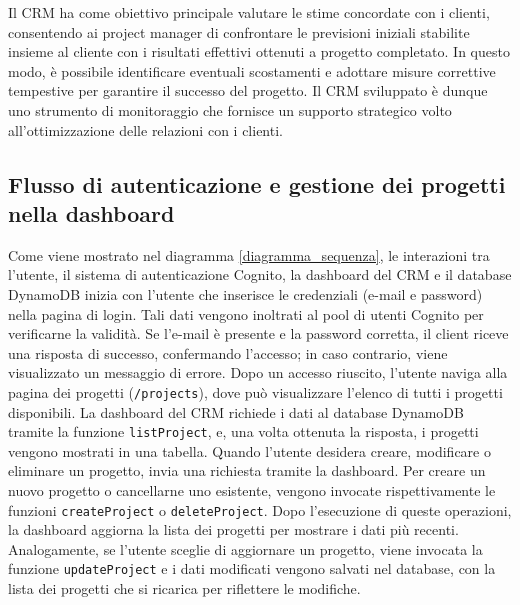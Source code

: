 \documentclass[target=bach,aauheader=,style=]{thud}
\begin{document}
\noindent Il CRM ha come obiettivo principale valutare le stime concordate con i clienti, consentendo ai project manager di confrontare le previsioni iniziali stabilite insieme al cliente con i risultati effettivi ottenuti a progetto completato. In questo modo, è possibile identificare eventuali scostamenti e adottare misure correttive tempestive per garantire il successo del progetto. Il CRM sviluppato è dunque uno strumento di monitoraggio che fornisce un supporto strategico volto all'ottimizzazione delle relazioni con i clienti.

\subsection{Flusso di autenticazione e gestione dei progetti nella dashboard}
Come viene mostrato nel diagramma \ref{diagramma_sequenza}, le interazioni tra l'utente, il sistema di autenticazione Cognito, la dashboard del CRM e il database DynamoDB inizia con l'utente che inserisce le credenziali (e-mail e password) nella pagina di login. Tali dati vengono inoltrati al pool di utenti Cognito per verificarne la validità. Se l'e-mail è presente e la password corretta, il client riceve una risposta di successo, confermando l'accesso; in caso contrario, viene visualizzato un messaggio di errore. Dopo un accesso riuscito, l'utente naviga alla pagina dei progetti (\texttt{/projects}), dove può visualizzare l'elenco di tutti i progetti disponibili. La dashboard del CRM richiede i dati al database DynamoDB tramite la funzione \texttt{listProject}, e, una volta ottenuta la risposta, i progetti vengono mostrati in una tabella. Quando l'utente desidera creare, modificare o eliminare un progetto, invia una richiesta tramite la dashboard. Per creare un nuovo progetto o cancellarne uno esistente, vengono invocate rispettivamente le funzioni \texttt{createProject} o \texttt{deleteProject}. Dopo l'esecuzione di queste operazioni, la dashboard aggiorna la lista dei progetti per mostrare i dati più recenti. Analogamente, se l'utente sceglie di aggiornare un progetto, viene invocata la funzione \texttt{updateProject} e i dati modificati vengono salvati nel database, con la lista dei progetti che si ricarica per riflettere le modifiche.
\end{document}
